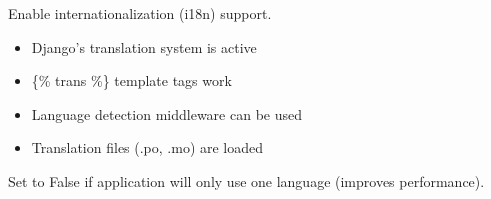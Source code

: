 \documentclass[letterpaper,10pt,english]{sphinxmanual}
\begin{document}
\begin{fulllineitems}
\label{\detokenize{softwareProject:softwareProject.settings.USE_I18N}}
\pysigstartsignatures
\pysigline
{}
\pysigstopsignatures
\sphinxAtStartPar
Enable internationalization (i18n) support.
\begin{description}
\begin{itemize}
\item {} 
\sphinxAtStartPar
Django’s translation system is active

\item {} 
\sphinxAtStartPar
\{\% trans \%\} template tags work

\item {} 
\sphinxAtStartPar
Language detection middleware can be used

\item {} 
\sphinxAtStartPar
Translation files (.po, .mo) are loaded

\end{itemize}

\end{description}

\sphinxAtStartPar
Set to False if application will only use one language (improves performance).

\end{fulllineitems}

\end{document}
